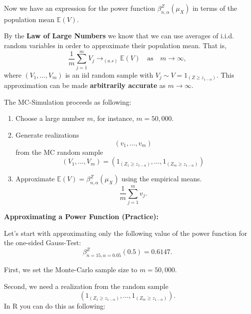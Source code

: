 \documentclass[]{book}
\providecommand{\tightlist}{%
  \setlength{\itemsep}{0pt}\setlength{\parskip}{0pt}}
\theoremstyle{definition}
\theoremstyle{definition}
\theoremstyle{definition}
\theoremstyle{remark}
\begin{document}
Now we have an expression for the power function \(\beta^{Z}_{n,\alpha}(\mu_X)\) in terms of the population mean \(\mathbb{E}(V)\).

By the \textbf{Law of Large Numbers} we know that we can use averages of i.i.d. random variables in order to approximate their population mean. That is,
\[
\frac{1}{m}\sum_{j=1}^m V_j\to_{(a.s)}\mathbb{E}(V)\quad\text{as}\quad m\to\infty,
\]
where \((V_1,\dots,V_m)\) is an iid random sample with \(V_j\sim V=1_{(Z \geq z_{1-\alpha})}\). This approximation can be made \textbf{arbitrarily accurate} as \(m\to\infty\).

The MC-Simulation proceeds as following:

\begin{enumerate}
\def\labelenumi{\arabic{enumi}.}
\tightlist
\item
  Choose a large number \(m\), for instance, \(m=50,000\).
\item
  Generate realizations
  \[
   (v_1,\dots,v_m)
   \]
  from the MC random sample
  \[
   (V_1,\dots,V_m)=(1_{(Z_1 \geq z_{1-\alpha})},\dots,1_{(Z_m \geq z_{1-\alpha})})
   \]
\item
  Approximate \(\mathbb{E}(V)=\beta^{Z}_{n,\alpha}(\mu_X)\) using the empirical means.
  \[
   \frac{1}{m}\sum_{j=1}^m v_j.
   \]
\end{enumerate}

\textbf{Approximating a Power Function (Practice):}

Let's start with approximating only the following value of the power function for the one-sided Gauss-Test:
\[
\beta^{Z}_{n=15,\alpha=0.05}(0.5)=0.6147.
\]

First, we set the Monte-Carlo sample size to \(m=50,000\).

Second, we need a realization from the random sample
\[
(1_{(Z_1 \geq z_{1-\alpha})},\dots,1_{(Z_m \geq z_{1-\alpha})}).
\]
In R you can do this as following:
\end{document}
